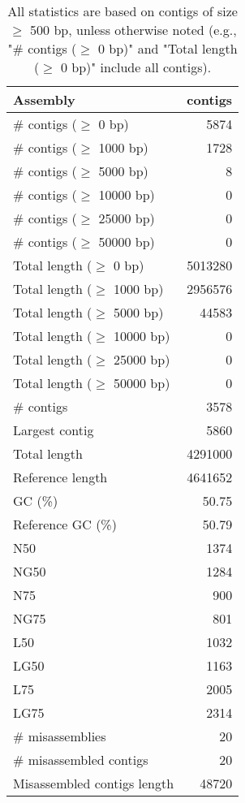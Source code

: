 \documentclass[12pt,a4paper]{article}
\begin{document}
\begin{table}[ht]
\begin{center}
\caption{All statistics are based on contigs of size $\geq$ 500 bp, unless otherwise noted (e.g., "\# contigs ($\geq$ 0 bp)" and "Total length ($\geq$ 0 bp)" include all contigs).}
\begin{tabular}{|l*{1}{|r}|}
\hline
Assembly & contigs \\ \hline
\# contigs ($\geq$ 0 bp) & 5874 \\ \hline
\# contigs ($\geq$ 1000 bp) & 1728 \\ \hline
\# contigs ($\geq$ 5000 bp) & 8 \\ \hline
\# contigs ($\geq$ 10000 bp) & 0 \\ \hline
\# contigs ($\geq$ 25000 bp) & 0 \\ \hline
\# contigs ($\geq$ 50000 bp) & 0 \\ \hline
Total length ($\geq$ 0 bp) & 5013280 \\ \hline
Total length ($\geq$ 1000 bp) & 2956576 \\ \hline
Total length ($\geq$ 5000 bp) & 44583 \\ \hline
Total length ($\geq$ 10000 bp) & 0 \\ \hline
Total length ($\geq$ 25000 bp) & 0 \\ \hline
Total length ($\geq$ 50000 bp) & 0 \\ \hline
\# contigs & 3578 \\ \hline
Largest contig & 5860 \\ \hline
Total length & 4291000 \\ \hline
Reference length & 4641652 \\ \hline
GC (\%) & 50.75 \\ \hline
Reference GC (\%) & 50.79 \\ \hline
N50 & 1374 \\ \hline
NG50 & 1284 \\ \hline
N75 & 900 \\ \hline
NG75 & 801 \\ \hline
L50 & 1032 \\ \hline
LG50 & 1163 \\ \hline
L75 & 2005 \\ \hline
LG75 & 2314 \\ \hline
\# misassemblies & 20 \\ \hline
\# misassembled contigs & 20 \\ \hline
Misassembled contigs length & 48720 \\ \hline

\end{tabular}
\end{center}
\end{table}
\end{document}
